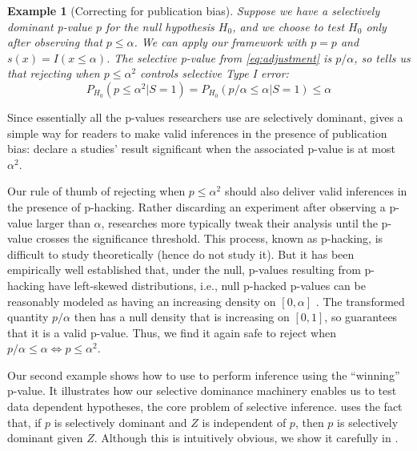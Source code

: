 \documentclass{article}
\newtheorem{example}{Example}
\begin{document}
\begin{example}[Correcting for publication bias]
\label{exm:correction}
Suppose we have a selectively dominant p-value $p$ for the null hypothesis $H_0$, and we choose to test $H_0$ only after observing that $p \leq \alpha$. We can apply our framework with $p=p$ and $s(x) = I(x \leq \alpha)$. The selective p-value from \eqref{eq:adjustment} is $p/\alpha$, so  tells us that rejecting when $p \leq \alpha^2$ controls selective Type I error:
\begin{equation*}
    P_{H_0}(p \leq \alpha^2 | S= 1) =  P_{H_0}(p/\alpha \leq \alpha | S= 1) \leq \alpha  
\end{equation*}
\end{example}

Since essentially all the p-values researchers use are selectively dominant,  gives a simple way for readers to make valid inferences in the presence of publication bias: declare a studies' result significant when the associated p-value is at most $\alpha^2$.

Our rule of thumb of rejecting when $p \leq \alpha^2$ should also deliver valid inferences in the presence of p-hacking. Rather discarding an experiment after observing a p-value larger than $\alpha$, researches more typically tweak their analysis until the p-value crosses the significance threshold. This process, known as p-hacking, is difficult to study theoretically (hence \cite{Hung2020} do not study it). But it has been empirically well established that, under the null, p-values resulting from p-hacking have left-skewed distributions, i.e., null p-hacked p-values can be reasonably modeled as having an increasing density on $[0,\alpha]$ \citep{Simonsohn}. The transformed quantity $p/\alpha$ then has a null density that is increasing on $[0, 1]$, so  guarantees that it is a valid p-value. Thus,  we find it again safe to reject when $p/\alpha \leq \alpha \iff p \leq \alpha^2$. 

Our second example shows how to use  to perform inference using the ``winning'' p-value. It illustrates how our selective dominance machinery enables us to test data dependent hypotheses, the core problem of selective inference.  uses the fact that, if $p$ is selectively dominant and $Z$ is independent of $p$, then $p$ is selectively dominant given $Z$. Although this is intuitively obvious, we show it carefully in . 
\end{document}
